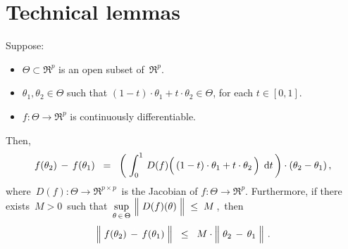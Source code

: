 

\section{Technical lemmas}
\setcounter{theorem}{0}
\setcounter{equation}{0}


\renewcommand{\theenumi}{\roman{enumi}}
\renewcommand{\labelenumi}{\textnormal{(\theenumi)}$\;\;$}


\begin{lemma}
\label{FTCRpRp}
\mbox{}\vskip 0.1cm
\noindent
Suppose:
\begin{itemize}
\item
	$\Theta \subset \Re^{p}$ is an open subset of \,$\Re^{p}$.
\item
	$\theta_{1}, \theta_{2} \in \Theta$ such that $(1-t) \cdot \theta_{1} + t \cdot \theta_{2} \in \Theta$, for each $t \in [0,1]$.
\item
	$f : \Theta \longrightarrow \Re^{p}$ is continuously differentiable.
\end{itemize}
Then,
\begin{equation*}
f(\theta_{2}) \, - \, f(\theta_{1})
\;\; = \;\;
	\left(\;\int_{0}^{1}\, D(f)\!\left(\,(1-t)\cdot \theta_{1} \overset{{\color{white}.}}{+} t \cdot \theta_{2} \,\right) \;\d t\,\right)
	\cdot (\theta_{2} - \theta_{1})\,,
\end{equation*}
where \,$D(f) : \Theta \longrightarrow \Re^{p \times p}$\,
is the Jacobian of $f : \Theta \longrightarrow \Re^{p}$.
Furthermore, if there exists \,$M > 0$\, such that
\,$\underset{\theta\,\in\,\Theta}{\sup}\,\left\Vert\;\overset{{\color{white}.}}{D}(f)(\theta)\;\right\Vert \;\leq\; M$\,,\,
then
\begin{equation*}
\left\Vert\; f(\theta_{2}) \, \overset{{\color{white}.}}{-} \, f(\theta_{1}) \;\right\Vert
\;\; \leq \;\;
	M %
	\cdot
	\left\Vert\; \theta_{2} \,\overset{{\color{white}.}}{-}\, \theta_{1} \;\right\Vert\,.
\end{equation*}
\end{lemma}
